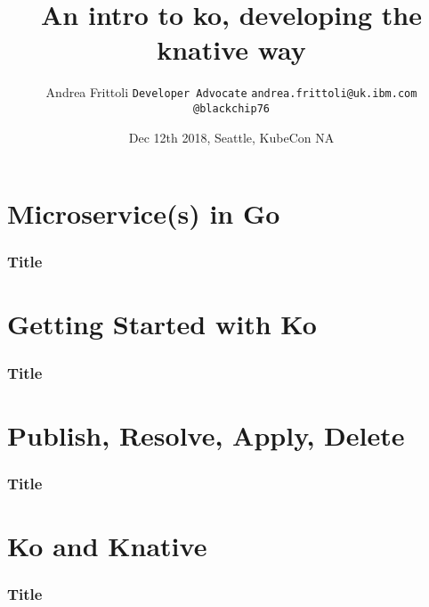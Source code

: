 \documentclass[aspectratio=169,11pt,hyperref={colorlinks=true}]{beamer}
\title{An intro to ko, developing the knative way}
\date[KubeCon NA]{Dec 12th 2018, Seattle, KubeCon NA}
\author[Author]{Andrea Frittoli \texttt{Developer Advocate} \texttt{andrea.frittoli@uk.ibm.com} \texttt{@blackchip76}}
\begin{document}
\begin{frame}[noframenumbering]
\titlepage{}
\end{frame}

\section{Microservice(s) in Go}

\begin{frame}
  \frametitle{Title}
\end{frame}

\section{Getting Started with Ko}

\begin{frame}
  \frametitle{Title}
\end{frame}

\section{Publish, Resolve, Apply, Delete}

\begin{frame}
  \frametitle{Title}
\end{frame}

\section{Ko and Knative}

\begin{frame}
  \frametitle{Title}
\end{frame}
\end{document}
